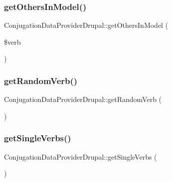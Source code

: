 \hypertarget{class_conjugation_data_provider_drupal_a2bf49d3e0b330eb944b6b64b5faf08f9}{}\label{class_conjugation_data_provider_drupal_a2bf49d3e0b330eb944b6b64b5faf08f9} 
\subsubsection{\texorpdfstring{get\+Others\+In\+Model()}{getOthersInModel()}}
{\footnotesize\ttfamily Conjugation\+Data\+Provider\+Drupal\+::get\+Others\+In\+Model (\begin{DoxyParamCaption}\item[{}]{\$verb }\end{DoxyParamCaption})}

\hypertarget{class_conjugation_data_provider_drupal_af81203c54e0747ab8d802bf931b9efdf}{}\label{class_conjugation_data_provider_drupal_af81203c54e0747ab8d802bf931b9efdf} 
\subsubsection{\texorpdfstring{get\+Random\+Verb()}{getRandomVerb()}}
{\footnotesize\ttfamily Conjugation\+Data\+Provider\+Drupal\+::get\+Random\+Verb (\begin{DoxyParamCaption}{ }\end{DoxyParamCaption})}

\hypertarget{class_conjugation_data_provider_drupal_aef3b4c81f910ce38cdb0faa3c6fee0c0}{}\label{class_conjugation_data_provider_drupal_aef3b4c81f910ce38cdb0faa3c6fee0c0} 
\subsubsection{\texorpdfstring{get\+Single\+Verbs()}{getSingleVerbs()}}
{\footnotesize\ttfamily Conjugation\+Data\+Provider\+Drupal\+::get\+Single\+Verbs (\begin{DoxyParamCaption}{ }\end{DoxyParamCaption})}


